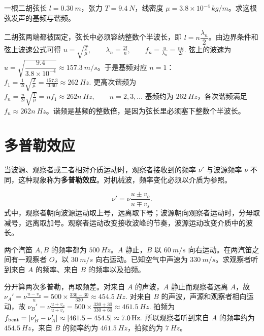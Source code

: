 \documentclass[lang=cn,11pt]{elegantbook}
\begin{document}
\begin{exercise}[二胡弦的基频和谐频怎样由边界条件决定]
一根二胡弦长 \(l=\SI{0.30}{m}\)，张力 \(T=\SI{9.4}{N}\)，线密度 \(\mu=3.8\times10^{-4}\,\si{kg/m}\)。求这根弦发声的基频与谐频。
\end{exercise}

\begin{solution}
二胡弦两端都被固定，弦长中必须容纳整数个半波长，即 \(l=n\dfrac{\lambda_n}{2}\)。由边界条件和弦上波速公式可得
 \(u=\sqrt{\frac{T}{\mu}},\qquad \lambda_n=\frac{2l}{n},\qquad f_n=\frac{u}{\lambda_n}=\frac{nu}{2l}.\) 
弦上的波速为 \(u=\sqrt{\dfrac{9.4}{3.8\times10^{-4}}}\approx \SI{157.3}{m/s}\)。于是基频对应 \(n=1\)：
 \(f_1=\frac{1}{2l}\sqrt{\frac{T}{\mu}} =\frac{157.3}{0.60} \approx \SI{262}{Hz}.\) 
更高次谐频为
 \(f_n=\frac{n}{2l}\sqrt{\frac{T}{\mu}} =n f_1 \approx 262n\ \si{Hz},\qquad n=2,3,\dots\) 
基频约为 \(\SI{262}{Hz}\)，各次谐频满足 \(f_n\approx 262n\ \si{Hz}\)。谐频是基频的整数倍，是因为弦长里必须塞下整数个半波长。
\end{solution}

\section{多普勒效应}

\begin{definition}[多普勒效应]
当波源、观察者或二者相对介质运动时，观察者接收到的频率 \(\nu'\) 与波源频率 \(\nu\) 不同，这种现象称为\textbf{多普勒效应}。对机械波，频率变化必须以介质为参照。

\[
\nu'=\nu\frac{u\pm v_o}{u\mp v_s}.
\]
式中，观察者朝向波源运动取上号，远离取下号；波源朝向观察者运动时，分母取减号，远离取加号。观察者运动改变接收波峰的节奏，波源运动改变介质中的波长。
\end{definition}

\begin{exercise}[两个汽笛同时发声时怎样判出拍频]
两个汽笛 \(A,B\) 的频率都为 \(\SI{500}{Hz}\)。\(A\) 静止，\(B\) 以 \(\SI{60}{m/s}\) 向右运动。在两汽笛之间有一观察者 \(O\)，以 \(\SI{30}{m/s}\) 向右运动。已知空气中声速为 \(\SI{330}{m/s}\)。求观察者听到来自 \(A\) 的频率、来自 \(B\) 的频率以及拍频。
\end{exercise}

\begin{solution}
分开算两次多普勒，再取频差。对来自 \(A\) 的声波，\(A\) 静止而观察者远离 \(A\)，故
 \(\nu_A'=\nu\frac{u-v_o}{u} =500\times\frac{330-30}{330} \approx \SI{454.5}{Hz}.\) 
对来自 \(B\) 的声波，声源和观察者相向运动，故
 \(\nu_B'=\nu\frac{u+v_o}{u+v_s} =500\times\frac{330+30}{330+60} \approx \SI{461.5}{Hz}.\) 
拍频为
 \(f_{\text{beat}}=\abs{\nu_B'-\nu_A'} \approx \abs{461.5-454.5} \approx \SI{7.0}{Hz}.\) 
所以观察者听到来自 \(A\) 的频率约为 \(\SI{454.5}{Hz}\)，来自 \(B\) 的频率约为 \(\SI{461.5}{Hz}\)，拍频约为 \(\SI{7}{Hz}\)。
\end{solution}
\end{document}
